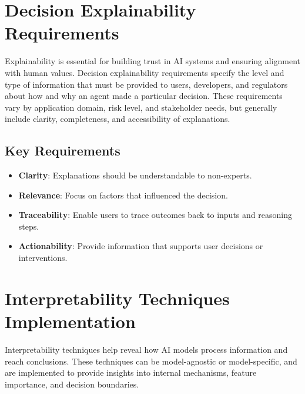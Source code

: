 
\begin{TNtwocol}

\section{Decision Explainability Requirements}
Explainability is essential for building trust in AI systems and ensuring alignment with human values. Decision explainability requirements specify the level and type of information that must be provided to users, developers, and regulators about how and why an agent made a particular decision. These requirements vary by application domain, risk level, and stakeholder needs, but generally include clarity, completeness, and accessibility of explanations.

\subsection{Key Requirements}
\begin{itemize}
    \item \textbf{Clarity}: Explanations should be understandable to non-experts.
    \item \textbf{Relevance}: Focus on factors that influenced the decision.
    \item \textbf{Traceability}: Enable users to trace outcomes back to inputs and reasoning steps.
    \item \textbf{Actionability}: Provide information that supports user decisions or interventions.
\end{itemize}

\section{Interpretability Techniques Implementation}
Interpretability techniques help reveal how AI models process information and reach conclusions. These techniques can be model-agnostic or model-specific, and are implemented to provide insights into internal mechanisms, feature importance, and decision boundaries.


\end{TNtwocol}
